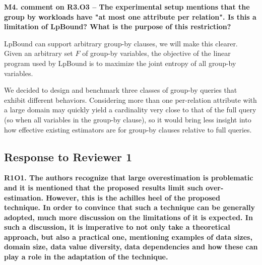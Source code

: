 \vspace{0.5em}\noindent
\textbf{
M4. comment on R3.O3 -- The experimental setup mentions that the group by workloads have "at most one attribute per relation". Is this a limitation of LpBound? What is the purpose of this restriction? 
}

{
\color{blue}
LpBound can support arbitrary group-by clauses, we will make this clearer. Given an arbitrary set $F$ of group-by variables, the objective of the linear program used by LpBound is to maximize the joint entropy of all group-by variables.

We decided to design and benchmark three classes of group-by queries that exhibit different behaviors. Considering more than one per-relation attribute with a large domain may quickly yield a cardinality very close to that of the full query (so when all variables in the group-by clause), so it would bring less insight into how effective existing estimators are for group-by clauses relative to full queries.
}


\subsection*{Response to Reviewer 1}  

\vspace{0.5em}\noindent
\textbf{
R1O1. The authors recognize that large overestimation is problematic and it is mentioned that the proposed results limit such over-estimation. However, this is the achilles heel of the proposed technique. In order to convince that such a technique can be generally adopted, much more discussion on the limitations of it is expected. In such a discussion, it is imperative to not only take a theoretical approach, but also a practical one, mentioning examples of data sizes, domain size, data value diversity, data dependencies and how these can play a role in the adaptation of the technique. 
}


